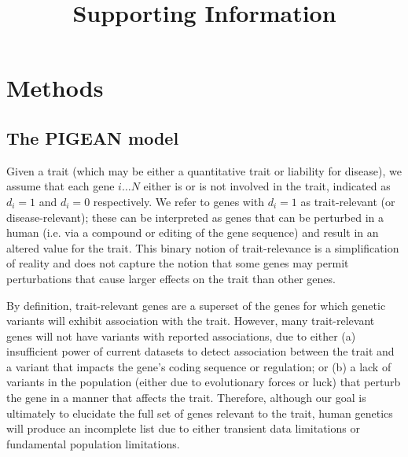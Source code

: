 \documentclass[11pt]{article}
\title{Supporting Information}
\author{}
\begin{document}


\maketitle

\section{Methods}

\subsection{The PIGEAN model}

Given a trait (which may be either a quantitative trait or liability
for disease), we assume that each gene $i\ldots
N$ either is or is not involved in the trait, indicated as $d_i=1$ and
$d_i=0$ respectively. We refer to genes with $d_i=1$ as
trait-relevant (or disease-relevant); these can be interpreted as genes that can be
perturbed in a human (i.e. via a compound or editing of the
gene sequence) and result in an altered value for the trait. This binary notion of trait-relevance is
a simplification of reality and does not capture the notion that some
genes may permit perturbations that cause larger effects on the trait
than other genes.

By definition, trait-relevant genes are a superset of the genes for which genetic
variants will exhibit association with the trait. However, many
trait-relevant genes will not have variants with reported
associations, due to either (a) insufficient power of current datasets
to detect association between the trait and a variant that impacts the
gene's coding sequence or regulation; or (b) a lack of variants in
the population (either due to evolutionary forces or luck) that
perturb the gene in a manner that affects the trait. Therefore,
although our goal is
ultimately to elucidate the full set of genes relevant to the trait, human genetics will produce an incomplete list due to
either transient data limitations or fundamental population limitations.
\end{document}
